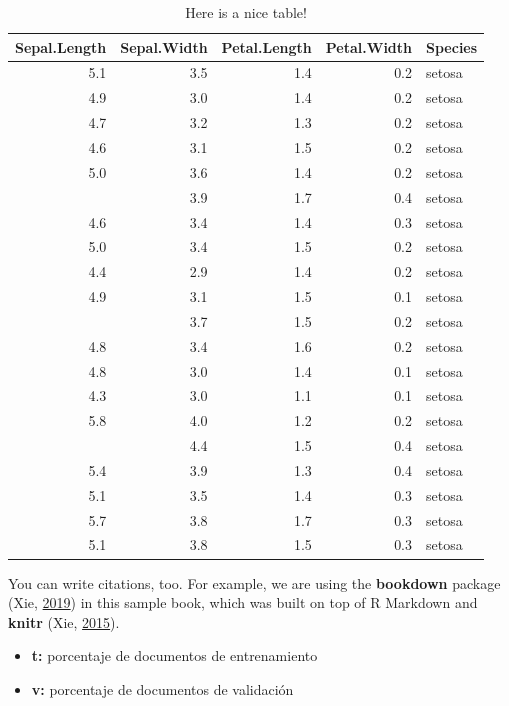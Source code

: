 \documentclass[12pt,a4paper,]{scrartcl}
\providecommand{\tightlist}{%
  \setlength{\itemsep}{0pt}\setlength{\parskip}{0pt}}
\begin{document}
\begin{table}

\caption{\label{tab:nice-tab}Here is a nice table!}
\centering
\begin{tabular}[t]{rrrrl}
\toprule
Sepal.Length & Sepal.Width & Petal.Length & Petal.Width & Species\\
\midrule
5.1 & 3.5 & 1.4 & 0.2 & setosa\\
4.9 & 3.0 & 1.4 & 0.2 & setosa\\
4.7 & 3.2 & 1.3 & 0.2 & setosa\\
4.6 & 3.1 & 1.5 & 0.2 & setosa\\
5.0 & 3.6 & 1.4 & 0.2 & setosa\\
\addlinespace
5.4 & 3.9 & 1.7 & 0.4 & setosa\\
4.6 & 3.4 & 1.4 & 0.3 & setosa\\
5.0 & 3.4 & 1.5 & 0.2 & setosa\\
4.4 & 2.9 & 1.4 & 0.2 & setosa\\
4.9 & 3.1 & 1.5 & 0.1 & setosa\\
\addlinespace
5.4 & 3.7 & 1.5 & 0.2 & setosa\\
4.8 & 3.4 & 1.6 & 0.2 & setosa\\
4.8 & 3.0 & 1.4 & 0.1 & setosa\\
4.3 & 3.0 & 1.1 & 0.1 & setosa\\
5.8 & 4.0 & 1.2 & 0.2 & setosa\\
\addlinespace
5.7 & 4.4 & 1.5 & 0.4 & setosa\\
5.4 & 3.9 & 1.3 & 0.4 & setosa\\
5.1 & 3.5 & 1.4 & 0.3 & setosa\\
5.7 & 3.8 & 1.7 & 0.3 & setosa\\
5.1 & 3.8 & 1.5 & 0.3 & setosa\\
\bottomrule
\end{tabular}
\end{table}

You can write citations, too. For example, we are using the \textbf{bookdown} package (Xie, \protect\hyperlink{ref-R-bookdown}{2019}) in this sample book, which was built on top of R Markdown and \textbf{knitr} (Xie, \protect\hyperlink{ref-xie2015}{2015}).

\newpage

\hypertarget{appendix-anexo-datos-de-resultados}{%
\appendix}


\begin{itemize}
\tightlist
\item
  \textbf{t:} porcentaje de documentos de entrenamiento
\item
  \textbf{v:} porcentaje de documentos de validación
\end{itemize}
\end{document}
